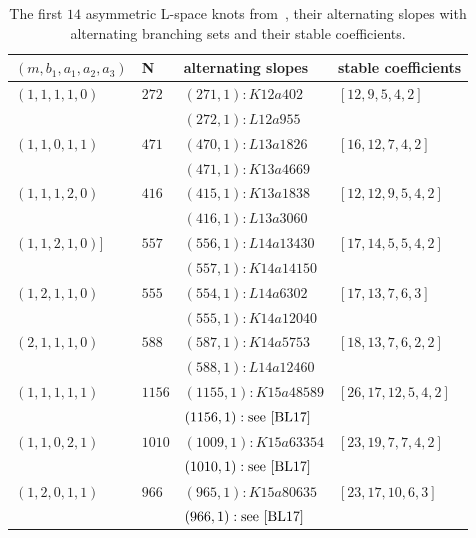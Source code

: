 \documentclass{amsart} %
\theoremstyle{thm}
\theoremstyle{definition}
\newcommand{\ra}[1]{\renewcommand{\arraystretch}{#1}} %
\numberwithin{equation}{section}
\begin{document}
\begin{table}[htbp]
 	\caption{The first $14$ asymmetric L-space knots from~\cite{BL17}, their alternating slopes with alternating branching sets and their stable coefficients.} 

\label{tab:BL_Knots_alt2}
 \ra{1.2}
\begin{tabular}{@{}l|l|l|l@{}}
\toprule
$(m,b_1,a_1,a_2,a_3)$ & N & alternating slopes & stable coefficients \\
\midrule
		
$(1, 1, 1, 1, 0)$ & $272$ &$(271,1) : K12a402$ & $[12, 9, 5, 4, 2]$ \\
                  &       &$(272,1) : L12a955$   & \\
\hline
$(1, 1, 0, 1, 1)$& $471$ &$(470,1) : L13a1826$ & $[16, 12, 7, 4, 2]$ \\
                  &       &$(471,1) : K13a4669$   &\\
 \hline                 
$(1, 1, 1, 2, 0)$& $416$ &$(415,1) : K13a1838$ & $[12, 12, 9, 5, 4, 2]$  \\
                  &       &$(416,1) : L13a3060$   &\\
\hline                  
$(1, 1, 2, 1, 0)]$& $557$ &$(556,1) : L14a13430$ & $[17, 14, 5, 5, 4, 2]$ \\
                  &       &$(557,1) : K14a14150$   &\\
 \hline                 
$(1, 2, 1, 1, 0)$& $555$ &$(554,1) : L14a6302$ & $[17, 13, 7, 6, 3]$  \\
                  &       &$(555,1) : K14a12040$   &\\
  \hline                
$(2, 1, 1, 1, 0)$& $588$ &$(587,1) : K14a5753$ & $[18, 13, 7, 6, 2, 2]$ \\
                  &       &$(588,1) : L14a12460$   &\\
   \hline               
$(1, 1, 1, 1, 1)$& $1156$ &$(1155,1) : K15a48589$ & $[26, 17, 12, 5, 4, 2]$\\
                  &       & $(1156,1) :  \text{see \cite{BL17}} $ &\\
   \hline               
$(1, 1, 0, 2, 1)$& $1010$ &$(1009,1) : K15a63354$ & $[23, 19, 7, 7, 4, 2]$  \\
                  &       & $(1010,1) : \text{see \cite{BL17}} $ &\\
  \hline                
$(1, 2, 0, 1, 1)$& $966$ &$(965,1) : K15a80635$ & $[23, 17, 10, 6, 3]$  \\
                  &       & $(966,1) : \text{see \cite{BL17}}$ &\\

\end{tabular}
\end{table}
\end{document}
